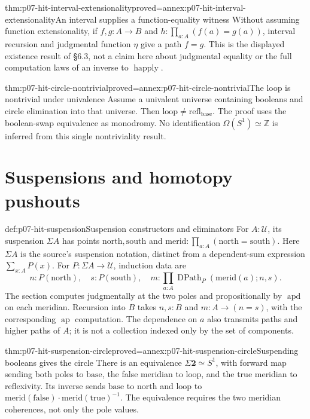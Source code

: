 \begin{hbtheorem}{thm:p07-hit-interval-extensionality}{proved=annex:p07-hit-interval-extensionality}{An interval supplies a function-equality witness}
Without assuming function extensionality, if \(f,g:A\to B\) and
\(h:\prod_{a:A}(f(a)=g(a))\), interval recursion and judgmental function
\(\eta\) give a path \(f=g\). This is the displayed existence result of
\S6.3, not a claim here about judgmental equality or the full computation
laws of an inverse to \(\operatorname{happly}\).
\end{hbtheorem}

\begin{hbtheorem}{thm:p07-hit-circle-nontrivial}{proved=annex:p07-hit-circle-nontrivial}{The loop is nontrivial under univalence}
Assume a univalent universe containing booleans and circle elimination into
that universe. Then \(\mathrm{loop}\ne\mathrm{refl}_{\mathrm{base}}\).
The proof uses the boolean-swap equivalence as monodromy. No identification
\(\Omega(S^1)\simeq\mathbb Z\) is inferred from this single nontriviality
result.
\end{hbtheorem}

\section{Suspensions and homotopy pushouts}

\begin{hbdefinition}{def:p07-hit-suspension}{Suspension constructors and eliminators}
For \(A:\mathcal U\), its suspension \(\Sigma A\) has points
\(\mathrm{north},\mathrm{south}\) and
\(\mathrm{merid}:\prod_{a:A}(\mathrm{north}=\mathrm{south})\).
Here \(\Sigma A\) is the source's suspension notation, distinct from a
dependent-sum expression \(\sum_{x:A}P(x)\).
For \(P:\Sigma A\to\mathcal U\), induction data are
\[
 n:P(\mathrm{north}),\quad s:P(\mathrm{south}),\quad
 m:\prod_{a:A}\operatorname{DPath}_P(\mathrm{merid}(a);n,s).
\]
The section computes judgmentally at the two poles and propositionally by
\(\operatorname{apd}\) on each meridian. Recursion into \(B\) takes
\(n,s:B\) and \(m:A\to(n=s)\), with the corresponding \(\operatorname{ap}\)
computation. The dependence on \(a\) also transmits paths and higher paths
of \(A\); it is not a collection indexed only by the set of components.
\end{hbdefinition}

\begin{hbtheorem}{thm:p07-hit-suspension-circle}{proved=annex:p07-hit-suspension-circle}{Suspending booleans gives the circle}
There is an equivalence \(\Sigma\mathbf2\simeq S^1\), with forward
map sending both poles to \(\mathrm{base}\), the false meridian to
\(\mathrm{loop}\), and the true meridian to reflexivity.
Its inverse sends \(\mathrm{base}\) to \(\mathrm{north}\) and
\(\mathrm{loop}\) to
\(\mathrm{merid}(\mathrm{false})\cdot\mathrm{merid}(\mathrm{true})^{-1}\).
The equivalence requires the two meridian coherences, not only the pole values.
\end{hbtheorem}

